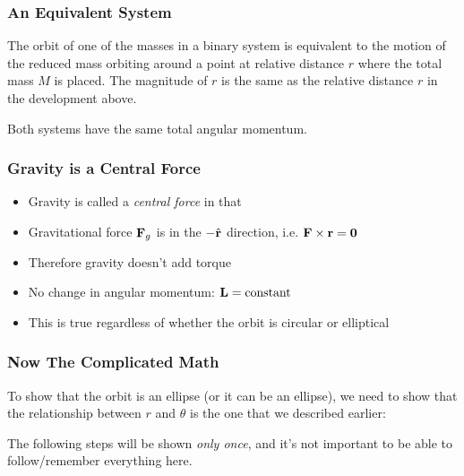 \documentclass[12pt,compress,aspectratio=169]{beamer}
\newcommand{\mb}[1]{\ensuremath\mathbf{#1}}
\newcommand{\eq}[2]{\vspace{#1}{\Large\begin{displaymath}#2\end{displaymath}}}
\begin{document}
\begin{frame}
  \frametitle{An Equivalent System}
  The orbit of one of the masses in a binary system is equivalent to the motion
  of the reduced mass orbiting around a point at relative distance $r$ where
  the total mass $M$ is placed. The magnitude of $r$ is the same as the
  relative distance $r$ in the development above.
  \begin{center}
  \end{center}

  Both systems have the same total angular momentum.
\end{frame}



\begin{frame}
  \frametitle{Gravity is a Central Force}
  \begin{itemize}
  \item Gravity is called a \emph{central force} in that
  \item Gravitational force $\mb{F}_g$ is in the $-\hat{\mb{r}}$ direction, i.e.
    $\mb{F}\times\mb{r}=\mb{0}$
  \item Therefore gravity doesn't add torque
  \item No change in angular momentum: $\mb{L}=\text{constant}$
  \item This is true regardless of whether the orbit is circular or elliptical
  \end{itemize}
\end{frame}



\begin{frame}
  \frametitle{Now The Complicated Math}
  To show that the orbit is an ellipse (or it can be an ellipse), we need to
  show that the relationship between $r$ and $\theta$ is the one
  that we described earlier:

  \eq{-.15in}{
    r=\frac{a(1-e^2)}{1+e\cos\theta}
  } 
  
  The following steps will be shown \emph{only once}, and it's not important to
  be able to follow/remember everything here.
\end{frame}
\end{document}
